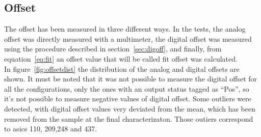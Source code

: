 \documentclass[main.tex]{subfiles}
\begin{document}
\subsection{Offset}

The offset has been measured in three different ways. In the tests, the analog offset was directly measured with a multimeter, the digital offset was measured using the procedure described in section~\ref{sec:digoff},
and finally, from equation~\ref{eq:fit} an offset value that will be called fit offset was calculated.\\
In figure~\ref{fig:offsetdist} the distribution of the analog and digital offsets are shown. It must be noted that it was not possible to measure the digital offset for all the configurations, only the ones with an output status tagged as ``Pos'', so it's not possible to measure negative values of digital offset. Some outliers were detected, with digital offset values very deviated from the mean, which has been removed from the sample at the final characterizaton. Those outiers correspond to \glspl{asic} 110, 209,248 and 437.
\end{document}
